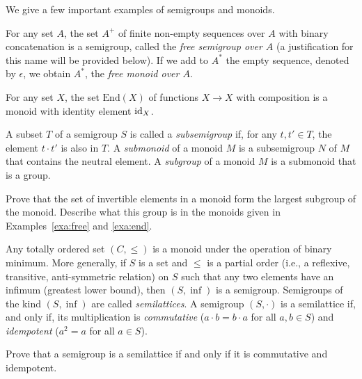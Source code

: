 We give a few important examples of semigroups and monoids.
\begin{example}\label{exa:free}
  For any set $A$, the set $A^+$ of finite non-empty sequences over $A$ with binary concatenation is a semigroup, called the \emph{free semigroup over $A$} (a justification for this name will be provided below). If we add to $A^*$ the empty sequence, denoted by $\epsilon$, we obtain $A^*$, the \emph{free monoid over $A$}.
\end{example}
\begin{example}\label{exa:end}
For any set $X$, the set $\mathrm{End}(X)$ of functions $X \to X$ with composition is a monoid with identity element $\mathrm{id}_X$.
\end{example}

\begin{definition}
  A subset $T$ of a semigroup $S$ is called a \emph{subsemigroup} if, for any $t, t' \in T$, the element $t \cdot t'$ is also in $T$.  A \emph{submonoid} of a monoid $M$ is a subsemigroup $N$ of $M$ that contains the neutral element. A \emph{subgroup} of a monoid $M$ is a submonoid that is a group.
\end{definition}
\begin{exercise}\easy
  Prove that the set of invertible elements in a monoid form the largest subgroup of the monoid. Describe what this group is in the monoids given in Examples~\ref{exa:free} and \ref{exa:end}.
\end{exercise}

\begin{example}
Any totally ordered set $(C, \leq)$ is a monoid under the operation of binary minimum. More generally, if $S$ is a set and $\leq$ is a partial order (i.e., a reflexive, transitive, anti-symmetric relation) on $S$ such that any two elements have an infimum (greatest lower bound), then $(S, \inf)$ is a semigroup. Semigroups of the kind $(S, \inf)$ are called \emph{semilattices}. A semigroup $(S, \cdot)$ is a semilattice if, and only if, its multiplication is \emph{commutative} ($a \cdot b = b \cdot a$ for all $a,b \in S$) and \emph{idempotent} ($a^2 = a$ for all $a \in S$).
\end{example}

\begin{exercise} \easy
  Prove that a semigroup is a semilattice if and only if it is commutative and idempotent.
\end{exercise}

